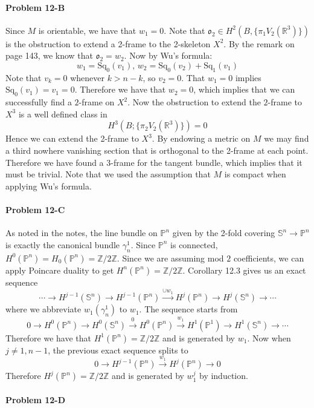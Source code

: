 \documentclass[12pt]{article}
\theoremstyle{plain}
\theoremstyle{definition}
\newcommand{\IP}{\mathbb{P}}
\newcommand{\IR}{\mathbb{R}}
\newcommand{\IS}{\mathbb{S}}
\newcommand{\IZ}{\mathbb{Z}}
\newcommand{\so}{\mathfrak{o}}
\newcommand{\<}{\langle}
\renewcommand{\>}{\rangle}
\newcommand{\Sq}{\mathrm{Sq}}
\begin{document}
\paragraph{Problem 12-B} Since $M$ is orientable, we have that $w_1 = 0$. Note that $\so_2 \in H^2(B, \{ \pi_1 V_2(\IR^3) \})$ is the obstruction to extend a 2-frame to the 2-skeleton $X^2$. By the remark on page 143, we know that $\so_2 = w_2$. Now by Wu's formula:
$$ w_1 = \Sq_0(v_1), \, w_2 = \Sq_0(v_2) + \Sq_1(v_1) $$
Note that $v_k = 0$ whenever $k > n - k$, so $v_2  = 0$. That $w_1 = 0$ implies $\Sq_0(v_1) = v_1 = 0$. Therefore we have that $w_2 = 0$, which implies that we can successfully find a $2$-frame on $X^2$. Now the obstruction to extend the $2$-frame to $X^3$ is a well defined class in 
$$ H^3(B; \{ \pi_2 V_2 (\IR^3) \}) = 0 $$
Hence we can extend the 2-frame to $X^3$. By endowing a metric on $M$ we may find a third nowhere vanishing section that is orthogonal to the 2-frame at each point. Therefore we have found a 3-frame for the tangent bundle, which implies that it must be trivial. Note that we used the assumption that $M$ is compact when applying Wu's formula. 

\paragraph{Problem 12-C} As noted in the notes, the line bundle on $\IP^n$ given by the 2-fold covering $\IS^n \to \IP^n$ is exactly the canonical bundle $\gamma_n^1$. Since $\IP^n$ is connected, $H^0(\IP^n) = H_0(\IP^n)= \IZ/2\IZ$. Since we are assuming mod $2$ coefficients, we can apply Poincare duality to get $H^n(\IP^n) = \IZ/2\IZ$. Corollary 12.3 gives us an exact sequence 
$$ \cdots \to H^{j - 1}(\IS^n) \to H^{j - 1}(\IP^n) \stackrel{\cup w_1}{\to} H^j(\IP^n) \to H^j(\IS^n) \to \cdots $$  
where we abbreviate $w_1(\gamma_n^1)$ to $w_1$. The sequence starts from 
$$ 0 \to H^0(\IP^n) \to H^0(\IS^n) \stackrel{0}{\to} H^0(\IP^n) \stackrel{w_1}{\to} H^1(\IP^1) \to H^1(\IS^n) \to \cdots $$
Therefore we have that $H^1(\IP^n) = \IZ/2\IZ$ and is generated by $w_1$. Now when $j \neq 1, n - 1$, the previous exact sequence splits to 
$$ 0 \to H^{j - 1}(\IP^n) \stackrel{w_1}{\to} H^j(\IP^n) \to 0 $$
Therefore $H^j(\IP^n) = \IZ/2\IZ$ and is generated by $w_1^j$ by induction. 

\paragraph{Problem 12-D}
\end{document}
